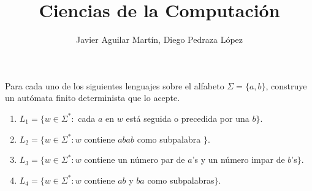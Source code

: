 \documentclass[twoside]{article}
\begin{document}
\title{Ciencias de la Computación}

\author{Javier Aguilar Martín, Diego Pedraza López}
\maketitle

\begin{ejercicio}{1}
Para cada uno de los siguientes lenguajes sobre el alfabeto $\Sigma=\{a,b\}$, construye un autómata finito determinista que lo acepte. 
\begin{enumerate}
\item $L_1=\{w\in\Sigma^*:$ cada $a$ en $w$ está seguida o precedida por una $b\}$.
\item $L_2=\{w\in\Sigma^*: w$ contiene $abab$ como subpalabra $\}$.
\item $L_3= \{w\in\Sigma^*: w$ contiene un número par de $a$'s y un número impar de $b$'s$\}$.
\item $L_4= \{w\in\Sigma^*: w$ contiene $ab$ y $ba$ como subpalabras$\}$.
\end{enumerate}
\end{ejercicio}
\end{document}

